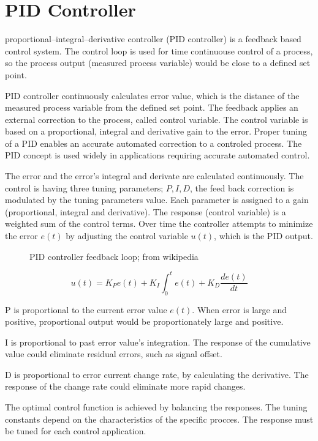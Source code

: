 \documentclass[\main/master.tex]{subfiles}
\begin{document}
\section{PID Controller}
proportional–integral–derivative controller (PID controller) is a feedback based control system. The control loop is used for time continuouse control of a process, so the process output (measured process variable) would be close to a defined set point.
\par
PID controller continuously calculates error value, which is the distance of the measured process variable from the defined set point. The feedback applies an external correction to the process, called control variable. The control variable is based on a proportional, integral and derivative gain to the error. Proper tuning of a PID enables an accurate automated correction to a controled process. The PID concept is used widely in applications requiring accurate automated control.



\par
The error and the error's integral and derivate are calculated continuously. The control is having three tuning parameters; $P, I, D$, the feed back correction is modulated by the tuning parameters value. Each parameter is assigned to a gain (proportional, integral and derivative). The response (control variable) is a weighted sum of the control terms. Over time the controller attempts to minimize the error $e(t)$ by adjusting the control variable $u(t)$, which is the PID output.
\par
\begin{figure}[htbp]
	\centering
	\caption[PID]{PID controller feedback loop; from wikipedia}
	\label{fig:PID_scheme}
\end{figure}
\begin{equation}
u(t) = K_Pe(t)+K_I\int_{0}^{t}e(t)+K_D\frac{de(t)}{dt}   \label{eqn:PID_eq}
\end{equation}


P is proportional to the current error value $e(t)$. When error is large and positive, proportional output would be proportionately large and positive.
\par
I is proportional to past error value's integration. The response of the cumulative value could eliminate residual errors, such as signal offset.
\par
D is proportional to error current change rate, by calculating the derivative. The response of the change rate could eliminate more rapid changes.
\par
The optimal control function is achieved by balancing the responses. The tuning constants depend on the characteristics of the specific procces. The response must be tuned for each control application.  
\end{document}

